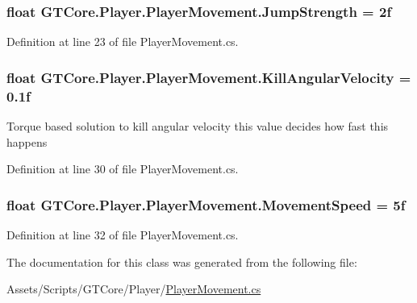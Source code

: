 \subsubsection[{Jump\+Strength}]{\setlength{\rightskip}{0pt plus 5cm}float G\+T\+Core.\+Player.\+Player\+Movement.\+Jump\+Strength = 2f}\label{class_g_t_core_1_1_player_1_1_player_movement_acbd313912a6eda65aed7bd5a393ad1d9}


Definition at line 23 of file Player\+Movement.\+cs.

\hypertarget{class_g_t_core_1_1_player_1_1_player_movement_a6b3a8ba0b37c65e7f364c6c2179b7789}{}
\subsubsection[{Kill\+Angular\+Velocity}]{\setlength{\rightskip}{0pt plus 5cm}float G\+T\+Core.\+Player.\+Player\+Movement.\+Kill\+Angular\+Velocity = 0.\+1f}\label{class_g_t_core_1_1_player_1_1_player_movement_a6b3a8ba0b37c65e7f364c6c2179b7789}


Torque based solution to kill angular velocity this value decides how fast this happens 



Definition at line 30 of file Player\+Movement.\+cs.

\hypertarget{class_g_t_core_1_1_player_1_1_player_movement_a37f2a584513b960296a50e17777cb491}{}
\subsubsection[{Movement\+Speed}]{\setlength{\rightskip}{0pt plus 5cm}float G\+T\+Core.\+Player.\+Player\+Movement.\+Movement\+Speed = 5f}\label{class_g_t_core_1_1_player_1_1_player_movement_a37f2a584513b960296a50e17777cb491}


Definition at line 32 of file Player\+Movement.\+cs.



The documentation for this class was generated from the following file\+:\begin{DoxyCompactItemize}
\item 
Assets/\+Scripts/\+G\+T\+Core/\+Player/\hyperlink{_player_movement_8cs}{Player\+Movement.\+cs}\end{DoxyCompactItemize}
